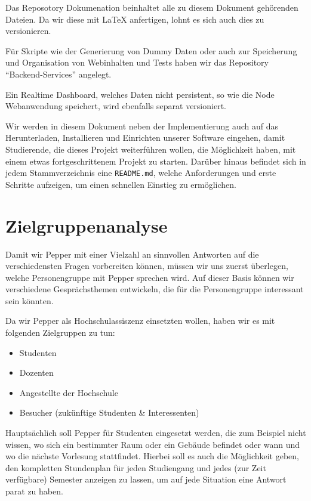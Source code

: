 Das Reposotory Dokumenation beinhaltet alle zu diesem Dokument gehörenden Dateien. Da wir diese mit \LaTeX{} anfertigen, lohnt es sich auch dies zu versionieren.

Für Skripte wie der Generierung von Dummy Daten oder auch zur Speicherung und Organisation von Webinhalten und Tests haben wir das Repository ``Backend-Services'' angelegt.

Ein Realtime Dashboard, welches Daten nicht persistent, so wie die Node Webanwendung speichert, wird ebenfalls separat versioniert.

Wir werden in diesem Dokument neben der Implementierung auch auf das Herunterladen, Installieren und Einrichten
unserer Software eingehen, damit Studierende, die dieses Projekt weiterführen wollen, die Möglichkeit
haben, mit einem etwas fortgeschrittenem Projekt zu starten. Darüber hinaus befindet sich in jedem Stammverzeichnis
eine \verb|README.md|, welche Anforderungen und erste Schritte aufzeigen, um einen schnellen Einstieg zu ermöglichen.\\

\section{Zielgruppenanalyse}
Damit wir Pepper mit einer Vielzahl an sinnvollen Antworten auf die verschiedensten Fragen vorbereiten können, müssen wir uns zuerst überlegen, welche Personengruppe mit Pepper sprechen wird. Auf dieser Basis können wir verschiedene Gesprächsthemen entwickeln, die für die Personengruppe interessant sein könnten.

Da wir Pepper als Hochschulassiszenz einsetzten wollen, haben wir es mit folgenden Zielgruppen zu tun:
\begin{itemize}
    \item Studenten
    \item Dozenten
    \item Angestellte der Hochschule
    \item Besucher (zukünftige Studenten \& Interessenten)
\end{itemize}

Hauptsächlich soll Pepper für Studenten eingesetzt werden, die zum Beispiel nicht wissen, wo sich ein bestimmter Raum oder ein Gebäude befindet oder wann und wo die nächste Vorlesung stattfindet. Hierbei soll es auch die Möglichkeit geben, den kompletten Stundenplan für jeden Studiengang und jedes (zur Zeit verfügbare) Semester anzeigen zu lassen, um auf jede Situation eine Antwort parat zu haben.

